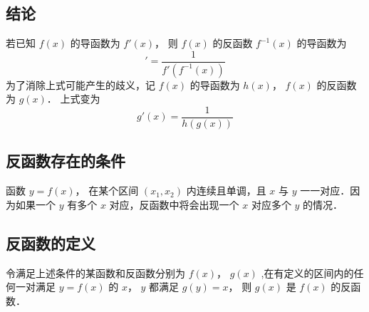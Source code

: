 
\subsection{结论}
若已知 $f\left( x \right)$ 的导函数为 $f'\left( x \right)$， 则 $f\left( x \right)$ 的反函数 ${f^{ - 1}}\left( x \right)$ 的导函数为
\begin{equation}
[{f^{ - 1}}\left( x \right)]' = \frac{1}{{f'\left( {{f^{ - 1}}\left( x \right)} \right)}} 
\end{equation} 
为了消除上式可能产生的歧义，记 $f\left( x \right)$ 的导函数为 $h\left( x \right)$，  $f\left( x \right)$ 的反函数为 $g\left( x \right)$． 上式变为
 \begin{equation}
g'\left( x \right) = \frac{1}{{h\left( {g\left( x \right)} \right)}} 
\end{equation}
\subsection{反函数存在的条件}
函数 $y = f\left( x \right)$， 在某个区间 $\left( {{x_1},{x_2}} \right)$ 内连续且单调，且 $x$ 与 $y$ 一一对应．因为如果一个 $y$ 有多个 $x$ 对应，反函数中将会出现一个 $x$ 对应多个 $y$ 的情况．
\subsection{反函数的定义}
令满足上述条件的某函数和反函数分别为 $f\left( x \right)$，  $g\left( x \right)$ ,在有定义的区间内的任何一对满足 $y = f\left( x \right)$ 的 $x$，  $y$ 都满足 $g\left( y \right) = x$， 则 $g\left( x \right)$ 是 $f\left( x \right)$ 的反函数．

